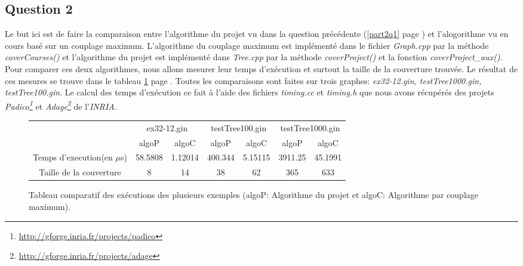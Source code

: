   \subsection{Question 2}
  Le but ici est de faire la comparaison entre l'algorithme du projet vu
  dans la question précédente (\ref{part2q1} page \pageref{part2q1}) et
  l'alogorithme vu en cours basé sur un couplage maximum.\newline
  \indent L'algorithme du couplage maximum est implémenté dans le fichier
  \emph{Graph.cpp} par la méthode \emph{coverCourses()} et l'algorithme
  du projet est implémenté dans \emph{Tree.cpp} par la méthode
  \emph{coverProject()} et la fonction \emph{coverProject\_aux()}.\newline
  \indent Pour comparer ces deux algorithmes, nous allons mesurer leur
  temps d'exécution et surtout la taille de la couverture trouvée. Le
  résultat de ces mesures se trouve dans le tableau \ref{tableau}
  page \pageref{tableau}. Toutes les comparaisons sont faites sur trois
  graphes: \emph{ex32-12.gin, testTree1000.gin, testTree100.gin}.\newline
  \indent Le calcul des temps d'exécution ce fait à l'aide des fichiers
  \emph{timing.cc} et \emph{timing.h} que nous avons récupérés des
  projets \emph{Padico\footnote{\url{http://gforge.inria.fr/projects/padico}}}
  et \emph{Adage\footnote{\url{http://gforge.inria.fr/projects/adage}}} de
  l'\emph{INRIA.}\newline

  \begin{figure}[!ht]
   \begin{center}
    \begin{tabular}{|c|c|c||c|c||c|c|}
     \cline{2-7}
     \multicolumn{1}{c|}{} & \multicolumn{2}{|c||}{ex32-12.gin}
     &\multicolumn{2}{|c||}{testTree100.gin} &
     \multicolumn{2}{|c|}{testTree1000.gin}\\ 
     \cline{2-7}
     \multicolumn{1}{c|}{} & algoP & algoC & algoP & algoC & algoP &
     algoC\\
     \hline
     Temps d'execution(en $\mu$s) & 58.5808 & 1.12014 & 400.344 &
     5.15115 & 3911.25 & 45.1991\\
     \hline
     Taille de la couverture & 8 & 14 & 38 & 62 & 365 & 633\\
     \hline
    \end{tabular}
    \caption{Tableau comparatif des exécutions des plusieurs
    exemples (algoP: Algorithme du projet et algoC: Algorithme par
    couplage maximum).\label{tableau}} 
   \end{center}
  \end{figure}  

